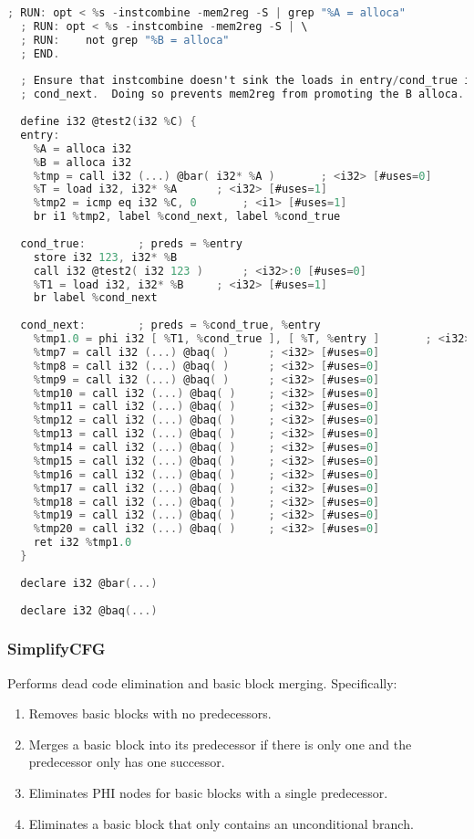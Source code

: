 \documentclass[a4paper]{article}
\theoremstyle{definition}
\begin{document}
\begin{lstlisting}[language=C]
  ; RUN: opt < %s -instcombine -mem2reg -S | grep "%A = alloca" 
  ; RUN: opt < %s -instcombine -mem2reg -S | \
  ; RUN:    not grep "%B = alloca"
  ; END.
  
  ; Ensure that instcombine doesn't sink the loads in entry/cond_true into 
  ; cond_next.  Doing so prevents mem2reg from promoting the B alloca.
  
  define i32 @test2(i32 %C) {
  entry:
    %A = alloca i32
    %B = alloca i32
    %tmp = call i32 (...) @bar( i32* %A )		; <i32> [#uses=0]
    %T = load i32, i32* %A		; <i32> [#uses=1]
    %tmp2 = icmp eq i32 %C, 0		; <i1> [#uses=1]
    br i1 %tmp2, label %cond_next, label %cond_true
  
  cond_true:		; preds = %entry
    store i32 123, i32* %B
    call i32 @test2( i32 123 )		; <i32>:0 [#uses=0]
    %T1 = load i32, i32* %B		; <i32> [#uses=1]
    br label %cond_next
  
  cond_next:		; preds = %cond_true, %entry
    %tmp1.0 = phi i32 [ %T1, %cond_true ], [ %T, %entry ]		; <i32> [#uses=1]
    %tmp7 = call i32 (...) @baq( )		; <i32> [#uses=0]
    %tmp8 = call i32 (...) @baq( )		; <i32> [#uses=0]
    %tmp9 = call i32 (...) @baq( )		; <i32> [#uses=0]
    %tmp10 = call i32 (...) @baq( )		; <i32> [#uses=0]
    %tmp11 = call i32 (...) @baq( )		; <i32> [#uses=0]
    %tmp12 = call i32 (...) @baq( )		; <i32> [#uses=0]
    %tmp13 = call i32 (...) @baq( )		; <i32> [#uses=0]
    %tmp14 = call i32 (...) @baq( )		; <i32> [#uses=0]
    %tmp15 = call i32 (...) @baq( )		; <i32> [#uses=0]
    %tmp16 = call i32 (...) @baq( )		; <i32> [#uses=0]
    %tmp17 = call i32 (...) @baq( )		; <i32> [#uses=0]
    %tmp18 = call i32 (...) @baq( )		; <i32> [#uses=0]
    %tmp19 = call i32 (...) @baq( )		; <i32> [#uses=0]
    %tmp20 = call i32 (...) @baq( )		; <i32> [#uses=0]
    ret i32 %tmp1.0
  }
  
  declare i32 @bar(...)
  
  declare i32 @baq(...)
\end{lstlisting}

\subsubsection{SimplifyCFG}
Performs dead code elimination and basic block merging. Specifically:
\begin{enumerate}
  \item Removes basic blocks with no predecessors.
  \item Merges a basic block into its predecessor if there is only one and the predecessor only has one successor.
  \item Eliminates PHI nodes for basic blocks with a single predecessor.
  \item Eliminates a basic block that only contains an unconditional branch.
\end{enumerate}
\end{document}
